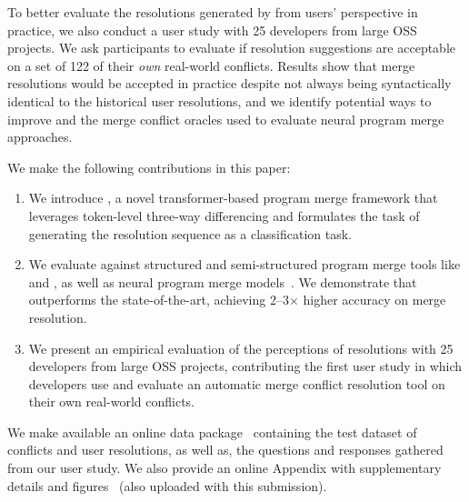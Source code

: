 To better evaluate the resolutions generated by \thistool{} from users' perspective in practice, we also conduct a user study with 25 developers from large OSS projects. We ask participants to evaluate if \thistool{} resolution suggestions are acceptable on a set of 122 of their {\it own} real-world conflicts. Results show that \thistool{} merge resolutions would be accepted in practice despite not always being syntactically identical to the historical user resolutions, and we identify potential ways to improve \thistool{} and the merge conflict oracles used to evaluate neural program merge approaches. 


We make the following contributions in this paper:
\begin{enumerate}
    \item We introduce \thistool{}, a novel transformer-based program merge framework that leverages token-level three-way differencing and formulates the task of generating the resolution sequence as a classification task.
    \item We evaluate \thistool{} against structured and semi-structured program merge tools like \jsfstmerge{} and \jdime{}, as well as neural program merge models~\cite{Dinella2021}. We demonstrate that \thistool{} outperforms the state-of-the-art, achieving 2--3$\times$ higher accuracy on merge resolution.%
    \item We present an empirical evaluation of the perceptions of \thistool{} resolutions with 25 developers from large OSS projects, contributing the first user study in which developers use and evaluate an automatic merge conflict resolution tool on their own real-world conflicts.
\end{enumerate}

We make available an online data package~\citep{ICSE22Replication} containing the test dataset of conflicts and user resolutions, as well as, the questions and responses gathered from our user study.  We also provide an online Appendix with supplementary details and figures~\cite{FSE22Appendix} (also uploaded with this submission).

